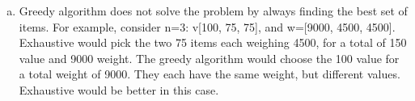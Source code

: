 \documentclass[11pt]{article}
\begin{document}
\begin{enumerate}
\begin{enumerate}[(a)]
				Efficiency class: \\
					\hspace*{.4cm}
					(nextHighest() $ \in \Theta(n)) $ \\
					\hspace*{.4cm}
					$ T(n)=\sum_{i=0}^{n-1} \sum_{j=0}^{n-1} 1 = n^2 \in \Theta(n^2) $ \\
		
			\item Greedy algorithm does not solve the problem by always finding the best set of items. For example, consider n=3: v[100, 75, 75], and w=[9000, 4500, 4500]. Exhaustive would pick the two 75 items each weighing 4500, for a total of 150 value and 9000 weight. The greedy algorithm would choose the 100 value for a total weight of 9000. They each have the same weight, but different values. Exhaustive would be better in this case.
		\end{enumerate}
	
	
\end{enumerate}
\end{document}
